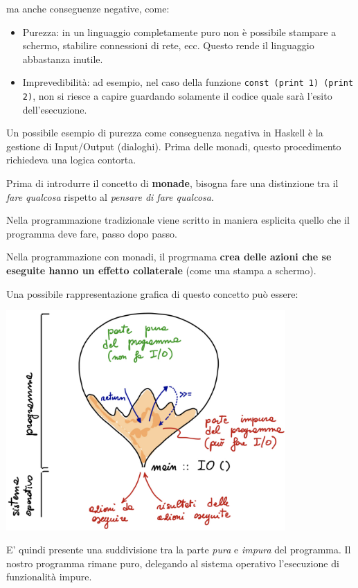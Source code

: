 \documentclass{article}
\begin{document}
ma anche conseguenze negative, come:
\begin{itemize}
    \item Purezza: in un linguaggio completamente puro non è possibile stampare a schermo, stabilire connessioni di rete, ecc. Questo rende il linguaggio abbastanza inutile.
    \item Imprevedibilità: ad esempio, nel caso della funzione \texttt{const (print 1) (print 2)}, non si riesce a capire guardando solamente il codice quale sarà l'esito dell'esecuzione.
\end{itemize}

Un possibile esempio di purezza come conseguenza negativa in Haskell è la gestione di Input/Output (dialoghi). Prima delle monadi, questo procedimento richiedeva una logica contorta.

\pagebreak

Prima di introdurre il concetto di \textbf{monade}, bisogna fare una distinzione tra il \textit{fare qualcosa} rispetto al \textit{pensare di fare qualcosa}.

Nella programmazione tradizionale viene scritto in maniera esplicita quello che il programma deve fare, passo dopo passo.

Nella programmazione con monadi, il progrmama \textbf{crea delle azioni che se eseguite hanno un effetto collaterale} (come una stampa a schermo).

Una possibile rappresentazione grafica di questo concetto può essere:\\
\begin{center}
    \includegraphics[width=0.8\textwidth]{img/monadi.png}
\end{center}

E' quindi presente una suddivisione tra la parte \textit{pura} e \textit{impura} del programma. Il nostro programma rimane puro, delegando al sistema operativo l'esecuzione di funzionalità impure.
\end{document}
